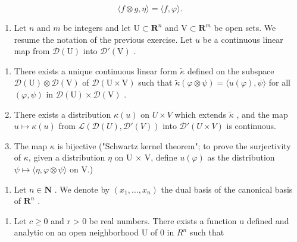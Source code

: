 \[
\langle f \otimes g, \eta \rangle = \langle f, \varphi \rangle .
\]

\begin{enumerate}
\def\labelenumi{\arabic{enumi})}
\setcounter{enumi}{28}
\tightlist
\item
  Let \(n\) and \(m\) be integers and let \(\mathrm{U} \subset \mathbf{R}^n\) and \(\mathrm{V} \subset \mathbf{R}^m\) be open sets. We resume the notation of the previous exercise. Let \(u\) be a continuous linear map from \(\mathcal{D}(\mathrm{U})\) into \(\mathcal{D}'(\mathrm{V})\) .
\end{enumerate}

\begin{enumerate}
\def\labelenumi{\alph{enumi})}
\item
  There exists a unique continuous linear form \(\widetilde{\kappa}\) defined on the subspace \(\mathcal{D}(\mathrm{U})\otimes \mathcal{D}(\mathrm{V})\) of \(\mathcal{D}(\mathrm{U}\times \mathrm{V})\) such that \(\widetilde{\kappa} (\varphi \otimes \psi) = \langle u(\varphi),\psi \rangle\) for all \((\varphi ,\psi)\) in \(\mathcal{D}(\mathrm{U})\times \mathcal{D}(\mathrm{V})\) .
\item
  There exists a distribution \(\kappa(u)\) on \(U \times V\) which extends \(\widetilde{\kappa}\) , and the map \(u \mapsto \kappa(u)\) from \(\mathcal{L}(\mathcal{D}(U), \mathcal{D}'(V))\) into \(\mathcal{D}'(U \times V)\) is continuous.
\item
  The map \(\kappa\) is bijective ("Schwartz kernel theorem"; to prove the surjectivity of \(\kappa\), given a distribution \(\eta\) on U × V, define \(u(\varphi)\) as the distribution \(\psi \mapsto \langle \eta, \varphi \otimes \psi \rangle\) on V.)
\end{enumerate}

\begin{enumerate}
\def\labelenumi{\arabic{enumi})}
\setcounter{enumi}{29}
\tightlist
\item
  Let \(n \in \mathbf{N}\) . We denote by \((x_1, \ldots, x_n)\) the dual basis of the canonical basis of \(\mathbf{R}^n\) .
\end{enumerate}

\begin{enumerate}
\def\labelenumi{\alph{enumi})}
\tightlist
\item
  Let \(c \geqslant 0\) and r \textgreater{} 0 be real numbers. There exists a function u defined and analytic on an open neighborhood U of 0 in \(R^{n}\) such that
\end{enumerate}

